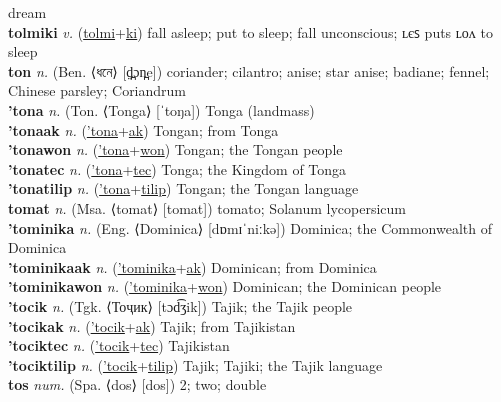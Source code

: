 dream \label{tolmicualum} \\
\textbf{tolmiki} \textit{v.} (\hyperref[tolmi]{tolmi}+\hyperref[ki]{ki})
fall asleep; put to sleep; fall unconscious; ʟєꜱ puts ʟᴏᴧ to sleep \label{tolmiki} \\
\textbf{ton} \textit{n.} (Ben. ⟨ধনে⟩ [d̪̤ɔn̪e])
coriander; cilantro; anise; star anise; badiane; fennel; Chinese parsley; Coriandrum \label{ton} \\
\textbf{'tona} \textit{n.} (Ton. ⟨Tonga⟩ [ˈtoŋa])
Tonga (landmass) \label{'tona} \\
\textbf{'tonaak} \textit{n.} (\hyperref['tona]{'tona}+\hyperref[ak]{ak})
Tongan; from Tonga \label{'tonaak} \\
\textbf{'tonawon} \textit{n.} (\hyperref['tona]{'tona}+\hyperref[won]{won})
Tongan; the Tongan people \label{'tonawon} \\
\textbf{'tonatec} \textit{n.} (\hyperref['tona]{'tona}+\hyperref[tec]{tec})
Tonga; the Kingdom of Tonga \label{'tonatec} \\
\textbf{'tonatilip} \textit{n.} (\hyperref['tona]{'tona}+\hyperref[tilip]{tilip})
Tongan; the Tongan language \label{'tonatilip} \\
\textbf{tomat} \textit{n.} (Msa. ⟨tomat⟩ [tomat])
tomato; Solanum lycopersicum \label{tomat} \\
\textbf{'tominika} \textit{n.} (Eng. ⟨Dominica⟩ [dɒmɪˈniːkə])
Dominica; the Commonwealth of Dominica \label{'tominika} \\
\textbf{'tominikaak} \textit{n.} (\hyperref['tominika]{'tominika}+\hyperref[ak]{ak})
Dominican; from Dominica \label{'tominikaak} \\
\textbf{'tominikawon} \textit{n.} (\hyperref['tominika]{'tominika}+\hyperref[won]{won})
Dominican; the Dominican people \label{'tominikawon} \\
\textbf{'tocik} \textit{n.} (Tgk. ⟨Тоҷик⟩ [tɔd͡ʒik])
Tajik; the Tajik people \label{'tocik} \\
\textbf{'tocikak} \textit{n.} (\hyperref['tocik]{'tocik}+\hyperref[ak]{ak})
Tajik; from Tajikistan \label{'tocikak} \\
\textbf{'tociktec} \textit{n.} (\hyperref['tocik]{'tocik}+\hyperref[tec]{tec})
Tajikistan \label{'tociktec} \\
\textbf{'tociktilip} \textit{n.} (\hyperref['tocik]{'tocik}+\hyperref[tilip]{tilip})
Tajik; Tajiki; the Tajik language \label{'tociktilip} \\
\textbf{tos} \textit{num.} (Spa. ⟨dos⟩ [dos])
2; two; double \label{tos} \\
